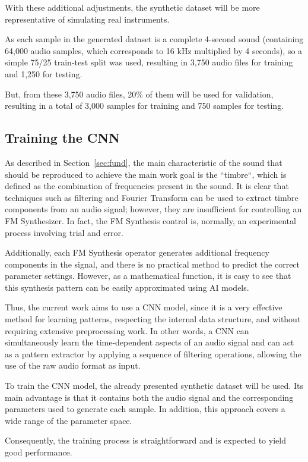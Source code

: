 \documentclass[10pt,conference]{IEEEtran}
\begin{document}
With these additional adjustments, the synthetic dataset will be more representative of simulating real instruments.

As each sample in the generated dataset is a complete 4-second sound (containing 64,000 audio samples, which corresponds to 16 kHz multiplied by 4 seconds), so a simple 75/25 train-test split was used, resulting in 3,750 audio files for training and 1,250 for testing.

But, from these 3,750 audio files, 20\% of them will be used for validation, resulting in a total of 3,000 samples for training and 750 samples for testing.

\subsection{Training the CNN}

As described in Section~\ref{sec:fund}, the main characteristic of the sound that should be reproduced to achieve the main work goal is the ``timbre``, which is defined as the combination of frequencies present in the sound. It is clear that techniques such as filtering and Fourier Transform can be used to extract timbre components from an audio signal; however, they are insufficient for controlling an FM Synthesizer. In fact, the FM Synthesis control is, normally, an experimental process involving trial and error.

Additionally, each FM Synthesis operator generates additional frequency components in the signal, and there is no practical method to predict the correct parameter settings. However, as a mathematical function, it is easy to see that this synthesis pattern can be easily approximated using AI models.

Thus, the current work aims to use a CNN model, since it is a very effective method for learning patterns, respecting the internal data structure, and without requiring extensive preprocessing work. In other words, a CNN can simultaneously learn the time-dependent aspects of an audio signal and can act as a pattern extractor by applying a sequence of filtering operations, allowing the use of the raw audio format as input.

To train the CNN model, the already presented synthetic dataset will be used. Its main advantage is that it contains both the audio signal and the corresponding parameters used to generate each sample. In addition, this approach covers a wide range of the parameter space.

Consequently, the training process is straightforward and is expected to yield good performance.
\end{document}

